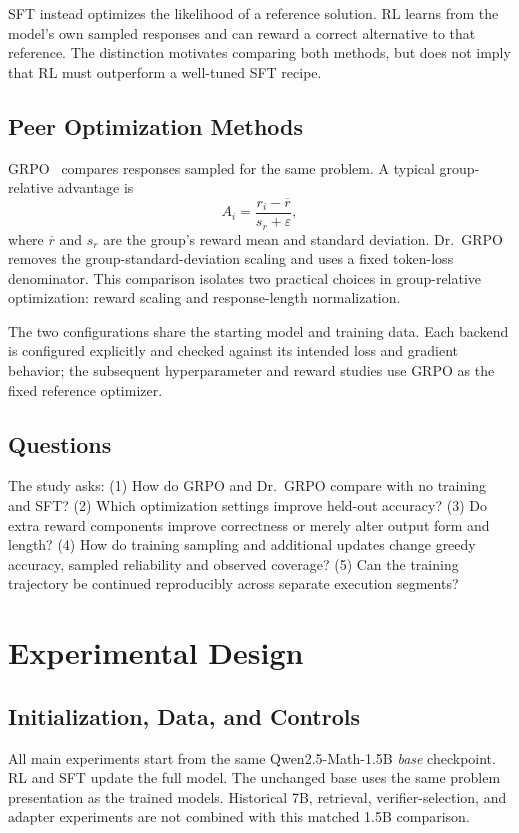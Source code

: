 \documentclass[conference]{IEEEtran}
\begin{document}
SFT instead optimizes the likelihood of a reference solution. RL learns from the model's own sampled responses and can reward a correct alternative to that reference. The distinction motivates comparing both methods, but does not imply that RL must outperform a well-tuned SFT recipe.

\subsection{Peer Optimization Methods}
GRPO~\cite{grpo} compares responses sampled for the same problem. A typical group-relative advantage is
\begin{equation}
A_i=\frac{r_i-\overline{r}}{s_r+\varepsilon},
\end{equation}
where $\overline{r}$ and $s_r$ are the group's reward mean and standard deviation. Dr.~GRPO~\cite{drgrpo} removes the group-standard-deviation scaling and uses a fixed token-loss denominator. This comparison isolates two practical choices in group-relative optimization: reward scaling and response-length normalization.

The two configurations share the starting model and training data. Each backend is configured explicitly and checked against its intended loss and gradient behavior; the subsequent hyperparameter and reward studies use GRPO as the fixed reference optimizer.

\subsection{Questions}
The study asks: (1) How do GRPO and Dr.~GRPO compare with no training and SFT? (2) Which optimization settings improve held-out accuracy? (3) Do extra reward components improve correctness or merely alter output form and length? (4) How do training sampling and additional updates change greedy accuracy, sampled reliability and observed coverage? (5) Can the training trajectory be continued reproducibly across separate execution segments?

\section{Experimental Design}
\subsection{Initialization, Data, and Controls}
All main experiments start from the same Qwen2.5-Math-1.5B \emph{base} checkpoint. RL and SFT update the full model. The unchanged base uses the same problem presentation as the trained models. Historical 7B, retrieval, verifier-selection, and adapter experiments are not combined with this matched 1.5B comparison.
\end{document}
